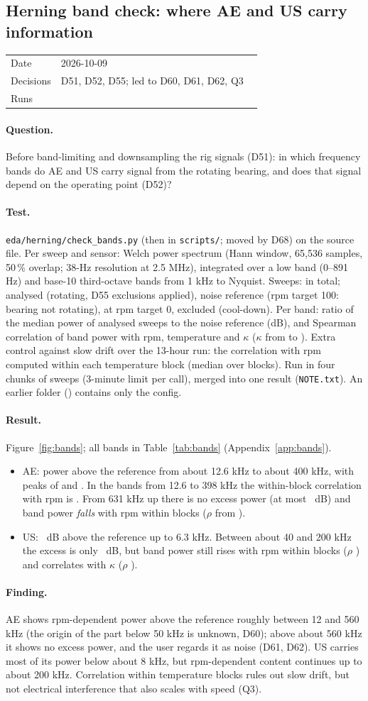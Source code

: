 \documentclass[11pt,a4paper]{article}
\makeatletter
\newcommand{\entry}[5]{%
  \subsection{#2}\label{#1}
  \begin{tabular}{@{}>{\footnotesize\color{muted}}l>{\footnotesize}p{0.8\linewidth}@{}}
    Date & #3 \\ Decisions & #4 \\ Runs & #5
  \end{tabular}\par}
\newcommand{\question}{\paragraph{Question.}}
\newcommand{\test}{\paragraph{Test.}}
\newcommand{\result}{\paragraph{Result.}}
\newcommand{\finding}{\paragraph{Finding.}}
\newcommand{\run}[1]{\texttt{\detokenize{#1}}}
\makeatother
\begin{document}
\entry{band-check}{Herning band check: where AE and US carry information}{2026-10-09}
  {D51, D52, D55; led to D60, D61, D62, Q3}{\run{20261009_085307_band_check_herning}}

\question
Before band-limiting and downsampling the rig signals (D51): in which frequency bands do
AE and US carry signal from the rotating bearing, and does that signal depend on the
operating point (D52)?

\test
\texttt{eda/herning/check\_bands.py} (then in \texttt{scripts/}; moved by D68) on the source file. Per sweep and sensor: Welch power
spectrum (Hann window, 65,536 samples, 50\,\% overlap; 38-Hz resolution at 2.5 MHz),
integrated over a low band (0--891 Hz) and base-10 third-octave bands from 1 kHz to
Nyquist. Sweeps: \BandSweeps{} in total; \BandAnalysed{} analysed (rotating, D55
exclusions applied), \BandNoise{} noise reference (rpm target 100: bearing not rotating),
\BandZero{} at rpm target 0, \BandExcluded{} excluded (cool-down). Per band: ratio of the
median power of analysed sweeps to the noise reference (dB), and Spearman correlation of
band power with rpm, temperature and $\kappa$ ($\kappa$ from \BandKappaMin{} to
\BandKappaMax). Extra control against slow drift over the 13-hour run: the correlation with
rpm computed within each temperature block (median over blocks). Run in four chunks of
sweeps (3-minute limit per call), merged into one result (\texttt{NOTE.txt}). An earlier
folder (\run{20261009_085150_band_check_herning}) contains only the config.

\result
Figure~\ref{fig:bands}; all bands in Table~\ref{tab:bands} (Appendix~\ref{app:bands}).
\begin{itemize}
  \item AE: power above the reference from about 12.6 kHz to about 400 kHz, with peaks of
        \BandAePeakLow{} and \BandAePeakHigh. In the bands from 12.6 to 398 kHz the
        within-block correlation with rpm is \BandAeCoreRpm. From 631 kHz up there is no
        excess power (at most \BandAeTopDb~dB) and band power \emph{falls} with rpm within
        blocks ($\rho$ from \BandAeTopRpm).
  \item US: \BandUsLowDb~dB above the reference up to 6.3 kHz. Between about 40 and 200 kHz
        the excess is only \BandUsMidDb~dB, but band power still rises with rpm within
        blocks ($\rho$ \BandUsMidRpm) and correlates with $\kappa$ ($\rho$ \BandUsMidKappa).
\end{itemize}

\finding
AE shows rpm-dependent power above the reference roughly between 12 and 560 kHz (the
origin of the part below 50 kHz is unknown, D60); above about 560 kHz it shows no excess
power, and the user regards it as noise (D61, D62). US carries most of its power below about 8 kHz, but rpm-dependent content continues
up to about 200 kHz. Correlation within temperature blocks rules out slow drift, but not
electrical interference that also scales with speed (Q3).
\end{document}
